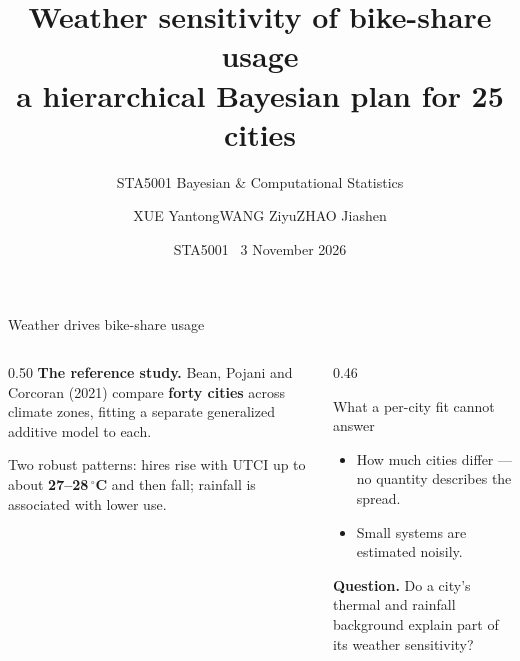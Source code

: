 \documentclass[aspectratio=169,11pt]{beamer}
\title[Weather and bike-share usage]{Weather sensitivity of bike-share usage\\a hierarchical Bayesian plan for 25 cities}
\subtitle{STA5001 Bayesian \& Computational Statistics}
\author{\small\cuhkszcoverrow
  {XUE Yantong}{WANG Ziyu}{ZHAO Jiashen}}
\institute{\footnotesize\cuhkszcoverrow
  {student1@example.com}{student2@example.com}{student3@example.com}}
\date{STA5001 \textperiodcentered\ 3 November 2026}
\newcommand{\hl}[1]{{\color{csPurple}\bfseries #1}}
\newcommand{\hlg}[1]{{\color{csGold}\bfseries #1}}
\begin{document}
\begin{frame}
  \titlepage
\end{frame}

\begin{frame}{Weather drives bike-share usage}
  \small
  \begin{columns}[T,onlytextwidth]
    \begin{column}{0.50\textwidth}
      \textbf{The reference study.} Bean, Pojani and Corcoran (2021) compare
      \hl{forty cities} across climate zones, fitting a separate generalized
      additive model to each.

      \vspace{0.30cm}
      Two robust patterns: hires rise with UTCI up to about
      \hlg{27--28\,$^\circ$C} and then fall; rainfall is associated with lower use.
    \end{column}
    \begin{column}{0.46\textwidth}
      \begin{alertblock}{What a per-city fit cannot answer}
        \begin{itemize}
          \item How much cities differ --- no quantity describes the spread.
          \item Small systems are estimated noisily.
        \end{itemize}
      \end{alertblock}
      \vspace{0.20cm}
      \textbf{Question.} Do a city's thermal and rainfall background explain
      part of its weather sensitivity?
    \end{column}
  \end{columns}
\end{frame}
\end{document}
